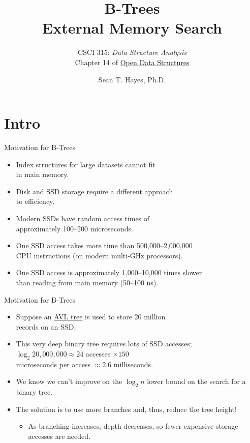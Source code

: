 \documentclass[14pt,aspectratio=1610]{beamer}
\title{\Huge{} B-Trees\\[-0.5em]{\Large{} External Memory Search}}
\subtitle{CSCI 315: \textit{Data Structure Analysis}\\Chapter 14 of \href{https://opendatastructures.org/ods-cpp.pdf}{Open Data Structures}}
\author{Sean T. Hayes, Ph.D.}
\institute{Charleston Southern University}
\begin{document}
\begin{frame}
  \titlepage
\end{frame}

\section*{Intro}

\begin{frame}{Motivation for B-Trees}
\begin{itemize}[<+->]
  \item
    Index structures for large datasets cannot fit \\in main memory.
  \item
    Disk and SSD storage require a different approach \\to efficiency.
  \item
    Modern SSDs have random access times of \\approximately 100--200 microseconds.
  \item
    One SSD access takes more time than 500,000--2,000,000 \\CPU instructions (on modern multi-GHz processors).
  \item
    One SSD access is approximately 1,000--10,000 times slower \\than reading from main memory (50--100 ns).
\end{itemize}
\end{frame}

\begin{frame}{Motivation for B-Trees}
\begin{itemize}[<+->]
  \item
    Suppose an \href{https://en.wikipedia.org/wiki/AVL_tree}{AVL tree} is used to store 20 million \\records on an SSD.
  \item
    This very deep binary tree requires lots of SSD accesses;\\
    \(\log_2{20,000,000} \approx 24\) accesses \(\times 150\) \\microseconds per access \(\approx 2.6\) milliseconds.
  \item
    We know we can't improve on the \(\log_2{n}\) lower bound on the search for a binary tree.
  \item
    The solution is to use more branches and, thus, reduce the tree height!
  \begin{itemize}
    \item
      As branching increases, depth decreases, so fewer expensive storage accesses are needed.
  \end{itemize}
\end{itemize}
\end{frame}
\end{document}
